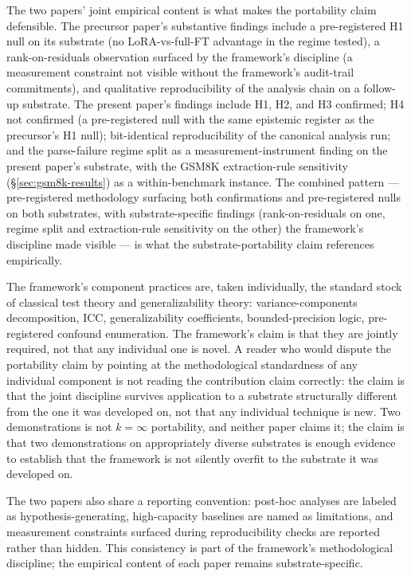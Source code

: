 \documentclass[11pt]{article}
\begin{document}
The two papers' joint empirical content is what makes the portability claim defensible. The precursor paper's substantive findings include a pre-registered H1 null on its substrate (no LoRA-vs-full-FT advantage in the regime tested), a rank-on-residuals observation surfaced by the framework's discipline (a measurement constraint not visible without the framework's audit-trail commitments), and qualitative reproducibility of the analysis chain on a follow-up substrate. The present paper's findings include H1, H2, and H3 confirmed; H4 not confirmed (a pre-registered null with the same epistemic register as the precursor's H1 null); bit-identical reproducibility of the canonical analysis run; and the parse-failure regime split as a measurement-instrument finding on the present paper's substrate, with the GSM8K extraction-rule sensitivity (§\ref{sec:gsm8k-results}) as a within-benchmark instance. The combined pattern --- pre-registered methodology surfacing both confirmations and pre-registered nulls on both substrates, with substrate-specific findings (rank-on-residuals on one, regime split and extraction-rule sensitivity on the other) the framework's discipline made visible --- is what the substrate-portability claim references empirically.

The framework's component practices are, taken individually, the standard stock of classical test theory and generalizability theory: variance-components decomposition, ICC, generalizability coefficients, bounded-precision logic, pre-registered confound enumeration. The framework's claim is that they are jointly required, not that any individual one is novel. A reader who would dispute the portability claim by pointing at the methodological standardness of any individual component is not reading the contribution claim correctly: the claim is that the joint discipline survives application to a substrate structurally different from the one it was developed on, not that any individual technique is new. Two demonstrations is not $k = \infty$ portability, and neither paper claims it; the claim is that two demonstrations on appropriately diverse substrates is enough evidence to establish that the framework is not silently overfit to the substrate it was developed on.

The two papers also share a reporting convention: post-hoc analyses are labeled as hypothesis-generating, high-capacity baselines are named as limitations, and measurement constraints surfaced during reproducibility checks are reported rather than hidden. This consistency is part of the framework's methodological discipline; the empirical content of each paper remains substrate-specific.
\end{document}
